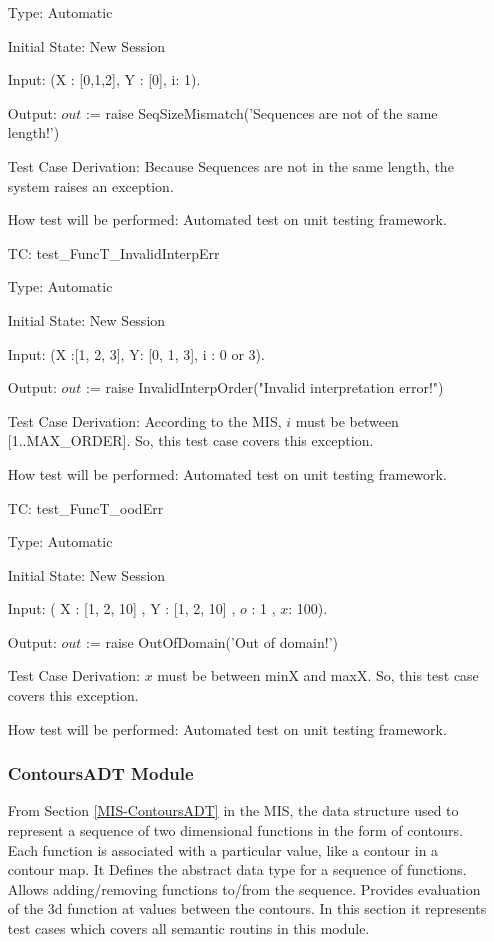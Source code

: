 \documentclass[12pt]{article}
\newcounter{utestnum} %
\begin{document}
\begin{enumerate}[label=TC\arabic*:,ref={\arabic*}]
Type: Automatic

Initial State: New Session

Input: (X : [0,1,2], Y : [0], i: 1).

Output: $out$ := raise SeqSizeMismatch('Sequences are not of the same length!')


Test Case Derivation: Because Sequences are not in the same length, the system raises an exception. 

How test will be performed: Automated test on unit testing framework.

\item [TC\refstepcounter{utestnum}\theutestnum: \label{FuncTssmErrTest}] 
test\_FuncT\_InvalidInterpErr

Type: Automatic

Initial State: New Session

Input: (X :[1, 2, 3], Y: [0, 1, 3], i : 0 or 3).

Output: $out$ := raise InvalidInterpOrder("Invalid interpretation error!")


Test Case Derivation: According to the MIS, $i$ must be between [1..\mbox{MAX\_ORDER}]. So, this test case covers this exception.

How test will be performed: Automated test on unit testing framework.

\item [TC\refstepcounter{utestnum}\theutestnum: \label{FuncToodErrTest}] 
test\_FuncT\_oodErr

Type: Automatic

Initial State: New Session

Input: ( X : [1, 2, 10] , Y : [1, 2, 10] , $o$ : 1 , $x$: 100).

Output: $out$ :=  raise OutOfDomain('Out of domain!')


Test Case Derivation:  $x$ must be between \mbox{minX} and \mbox{maxX}. So, this test case covers this exception.

How test will be performed: Automated test on unit testing framework.

\subsubsection{ContoursADT Module}	
From Section \ref{MIS-ContoursADT} in the MIS, the data structure used to represent a
sequence of two dimensional functions in the form of contours. Each function
is associated with a particular value, like a contour in a contour map.
It Defines the abstract data type for a sequence of functions.
Allows adding/removing functions to/from the sequence.  Provides evaluation of
the 3d function at values between the contours. In this section it represents test cases which covers all semantic routins in this module.


\end{enumerate}
\end{document}
